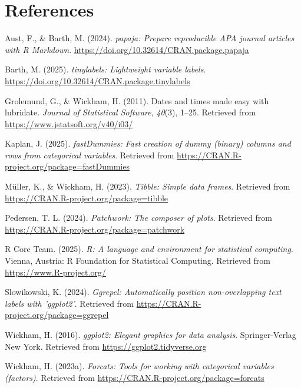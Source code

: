 \documentclass[
  man,floatsintext]{apa6}
\newlength{\cslhangindent}
\newenvironment{CSLReferences}[2] %
 {\begin{list}{}{%
  \setlength{\itemindent}{0pt}
  \setlength{\leftmargin}{0pt}
  \setlength{\parsep}{0pt}
  \ifodd #1
   \setlength{\leftmargin}{\cslhangindent}
   \setlength{\itemindent}{-1\cslhangindent}
  \fi
  \setlength{\itemsep}{#2\baselineskip}}}
 {\end{list}}
\begin{document}
\newpage

\section{References}\label{references}

\label{refs}
\begin{CSLReferences}{1}{0}
Aust, F., \& Barth, M. (2024). \emph{{papaja}: {Prepare} reproducible {APA} journal articles with {R Markdown}}. \url{https://doi.org/10.32614/CRAN.package.papaja}

Barth, M. (2025). \emph{{tinylabels}: Lightweight variable labels}. \url{https://doi.org/10.32614/CRAN.package.tinylabels}

Grolemund, G., \& Wickham, H. (2011). Dates and times made easy with {lubridate}. \emph{Journal of Statistical Software}, \emph{40}(3), 1--25. Retrieved from \url{https://www.jstatsoft.org/v40/i03/}

Kaplan, J. (2025). \emph{fastDummies: Fast creation of dummy (binary) columns and rows from categorical variables}. Retrieved from \url{https://CRAN.R-project.org/package=fastDummies}

Müller, K., \& Wickham, H. (2023). \emph{Tibble: Simple data frames}. Retrieved from \url{https://CRAN.R-project.org/package=tibble}

Pedersen, T. L. (2024). \emph{Patchwork: The composer of plots}. Retrieved from \url{https://CRAN.R-project.org/package=patchwork}

R Core Team. (2025). \emph{R: A language and environment for statistical computing}. Vienna, Austria: R Foundation for Statistical Computing. Retrieved from \url{https://www.R-project.org/}

Slowikowski, K. (2024). \emph{Ggrepel: Automatically position non-overlapping text labels with 'ggplot2'}. Retrieved from \url{https://CRAN.R-project.org/package=ggrepel}

Wickham, H. (2016). \emph{ggplot2: Elegant graphics for data analysis}. Springer-Verlag New York. Retrieved from \url{https://ggplot2.tidyverse.org}

Wickham, H. (2023a). \emph{Forcats: Tools for working with categorical variables (factors)}. Retrieved from \url{https://CRAN.R-project.org/package=forcats}


\end{CSLReferences}
\end{document}
